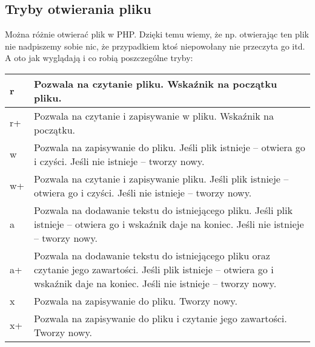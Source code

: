 \documentclass [a4paper, 10pt, oneside]{article}
\begin{document}
\subsection{Tryby otwierania pliku}
\hypertarget{tryby}{} Można różnie otwierać plik w PHP. Dzięki temu wiemy, że np. otwierając ten plik nie nadpiszemy sobie nic, że przypadkiem ktoś niepowołany nie przeczyta go itd. A oto jak wyglądają i co robią poszczególne tryby:
\begin{center}\begin{tabular}{|p{1.5cm}|p{10cm}|}
\hline
r & Pozwala na czytanie pliku. Wskaźnik na początku pliku.\\
\hline
r+ & Pozwala na czytanie i zapisywanie w pliku. Wskaźnik na początku.\\
\hline 
w & Pozwala na zapisywanie do pliku. Jeśli plik istnieje -- otwiera go i czyści. Jeśli nie istnieje -- tworzy nowy.\\
\hline
w+ & Pozwala na czytanie i zapisywanie pliku. Jeśli plik istnieje -- otwiera go i czyści. Jeśli nie istnieje -- tworzy nowy.\\
\hline
a & Pozwala na dodawanie tekstu do istniejącego pliku. Jeśli plik istnieje -- otwiera go i wskaźnik daje na koniec. Jeśli nie istnieje -- tworzy nowy.\\
\hline
a+ & Pozwala na dodawanie tekstu do istniejącego pliku oraz czytanie jego zawartości. Jeśli plik istnieje -- otwiera go i wskaźnik daje na koniec. Jeśli nie istnieje -- tworzy nowy.\\
\hline
x & Pozwala na zapisywanie do pliku. Tworzy nowy.\\
\hline
x+ & Pozwala na zapisywanie do pliku i czytanie jego zawartości. Tworzy nowy.\\
\hline
\end{tabular}\end{center}
\end{document}
